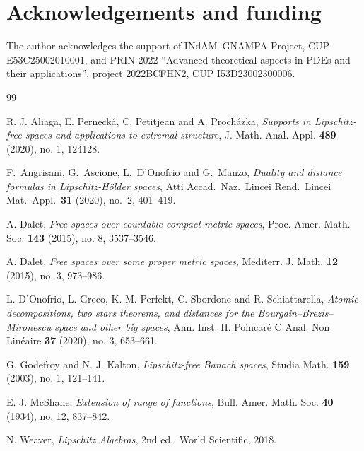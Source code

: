 \documentclass[11pt]{amsart}
\theoremstyle{plain}
\theoremstyle{definition}
\theoremstyle{remark}
\begin{document}
\section*{Acknowledgements and funding}
The author acknowledges the support of INdAM--GNAMPA Project, CUP
E53C25002010001, and PRIN 2022 ``Advanced theoretical aspects in PDEs and
their applications'', project 2022BCFHN2, CUP I53D23002300006.

\begin{thebibliography}{99}

R. J. Aliaga, E. Perneck\'a, C. Petitjean and A. Proch\'azka,
\emph{Supports in Lipschitz-free spaces and applications to extremal structure},
J. Math. Anal. Appl. \textbf{489} (2020), no. 1, 124128.

F.~Angrisani, G.~Ascione, L.~D'Onofrio and G.~Manzo,
\emph{Duality and distance formulas in Lipschitz-H\"older spaces},
Atti Accad.\ Naz.\ Lincei Rend.\ Lincei Mat.\ Appl.\
\textbf{31} (2020), no.~2, 401--419.


A. Dalet,
\emph{Free spaces over countable compact metric spaces},
Proc. Amer. Math. Soc. \textbf{143} (2015), no. 8, 3537--3546.

A. Dalet,
\emph{Free spaces over some proper metric spaces},
Mediterr. J. Math. \textbf{12} (2015), no. 3, 973--986.

L. D'Onofrio, L. Greco, K.-M. Perfekt, C. Sbordone and R. Schiattarella,
\emph{Atomic decompositions, two stars theorems, and distances for the
Bourgain--Brezis--Mironescu space and other big spaces},
Ann. Inst. H. Poincar\'e C Anal. Non Lin\'eaire \textbf{37} (2020), no. 3,
653--661.

G. Godefroy and N. J. Kalton,
\emph{Lipschitz-free Banach spaces},
Studia Math. \textbf{159} (2003), no. 1, 121--141.

E. J. McShane,
\emph{Extension of range of functions},
Bull. Amer. Math. Soc. \textbf{40} (1934), no. 12, 837--842.

N. Weaver,
\emph{Lipschitz Algebras}, 2nd ed., World Scientific, 2018.

\end{thebibliography}
\end{document}
